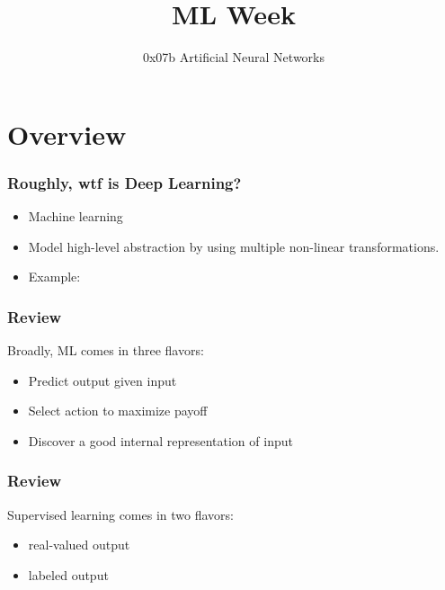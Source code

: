 
\title
{ML Week}
\subtitle{0x07b \hspace{2mm}  Artificial Neural Networks}




\begin{frame}
  \titlepage
\end{frame}

\section{Overview}

\begin{frame}
  \frametitle{Roughly, wtf is Deep Learning?}
  \begin{itemize}
  \item<1-> Machine learning
  \item<1-> Model high-level abstraction by using multiple non-linear
    transformations.
  \item<2-> Example: 
  \end{itemize}
\end{frame}

\begin{frame}
  \frametitle{Review}
  Broadly, ML comes in three flavors:
  \begin{itemize}
  \item {} Predict output given input
  \item {} Select action to maximize payoff
  \item {} Discover a good internal
    representation of input
  \end{itemize}
\end{frame}

\begin{frame}
  \frametitle{Review}
  Supervised learning comes in two flavors:
  \begin{itemize}
  \item {} real-valued output
  \item {} labeled output
  \end{itemize}
\end{frame}

